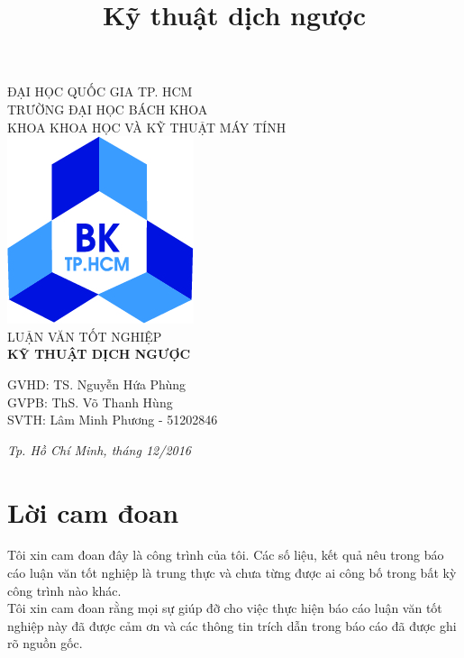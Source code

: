 \documentclass[12pt]{report}
\title{Kỹ thuật dịch ngược}
\begin{document}
	\chapter*{}
	\begin{center}
		ĐẠI HỌC QUỐC GIA TP. HCM\\
		TRƯỜNG ĐẠI HỌC BÁCH KHOA\\
		KHOA KHOA HỌC VÀ KỸ THUẬT MÁY TÍNH\\[10ex]
		\includegraphics[scale=0.5]{logoBK_jpg.jpg}\\[15ex]
		LUẬN VĂN TỐT NGHIỆP\\[10ex]
		\Large \textbf{KỸ THUẬT DỊCH NGƯỢC}\\[10ex]
	\end{center}
	
	
	\hspace*{7.5cm}GVHD: TS. Nguyễn Hứa Phùng\\
	\hspace*{8.15cm}GVPB: ThS. Võ Thanh Hùng\\[1ex]
	
	\hspace*{7.5cm}SVTH: Lâm Minh Phương - 51202846\\[8ex]
	
	\begin{center}
		\textit{Tp. Hồ Chí Minh, tháng 12/2016}
	\end{center}
	
	\chapter*{Lời cam đoan}
	
	Tôi xin cam đoan đây là công trình của tôi. Các số liệu, kết quả nêu trong báo cáo luận văn tốt nghiệp là trung thực và chưa từng được ai công bố trong bất kỳ công trình
	nào khác.\\
	Tôi xin cam đoan rằng mọi sự giúp đỡ cho việc thực hiện báo cáo luận văn tốt nghiệp này đã được cảm ơn và các thông tin trích dẫn trong báo cáo đã được ghi rõ nguồn gốc.
	
\end{document}
